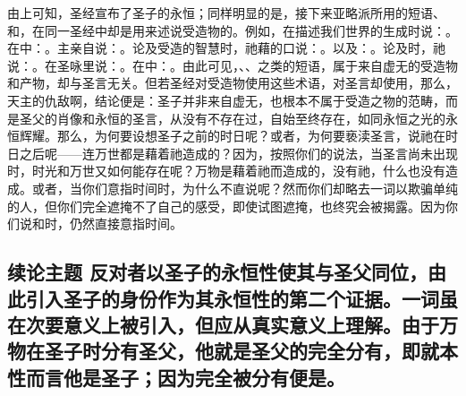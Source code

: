 由上可知，圣经宣布了圣子的永恒；同样明显的是，接下来亚略派所用的短语、和，在同一圣经中却是用来述说受造物的。例如，在描述我们世界的生成时说：。在中：。主亲自说：。论及受造的智慧时，祂藉的口说：。以及：。论及时，祂说：。在圣咏里说：。在中：。由此可见，、、之类的短语，属于来自虚无的受造物和产物，却与圣言无关。但若圣经对受造物使用这些术语，对圣言却使用，那么，天主的仇敌啊，结论便是：圣子并非来自虚无，也根本不属于受造之物的范畴，而是圣父的肖像和永恒的圣言，从没有不存在过，自始至终存在，如同永恒之光的永恒辉耀。那么，为何要设想圣子之前的时日呢？或者，为何要亵渎圣言，说祂在时日之后呢——连万世都是藉着祂造成的？因为，按照你们的说法，当圣言尚未出现时，时光和万世又如何能存在呢？万物是藉着祂而造成的，没有祂，什么也没有造成。或者，当你们意指时间时，为什么不直说呢？然而你们却略去一词以欺骗单纯的人，但你们完全遮掩不了自己的感受，即使试图遮掩，也终究会被揭露。因为你们说和时，仍然直接意指时间。\par


\subsection{续论主题 反对者以圣子的永恒性使其与圣父同位，由此引入圣子的身份作为其永恒性的第二个证据。一词虽在次要意义上被引入，但应从真实意义上理解。由于万物在圣子时分有圣父，他就是圣父的完全分有，即就本性而言他是圣子；因为完全被分有便是。}

